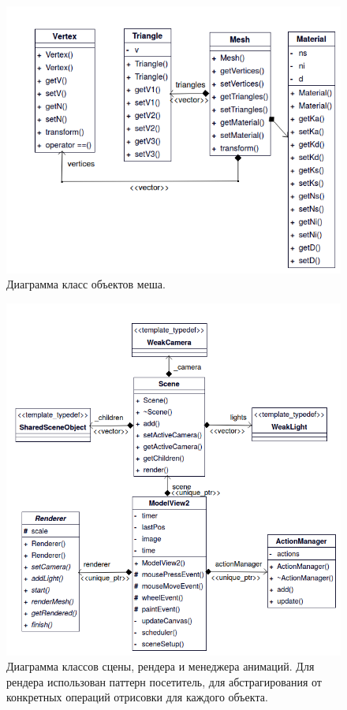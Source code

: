 \begin{figure}[H]
	\centering
	\begin{minipage}{1\textwidth}
		\centering
		\includegraphics[scale=0.65]{classes/mesh.png}
		\caption{Диаграмма класс объектов меша.}
		\label{class:mesh}
	\end{minipage}%
\end{figure}

\begin{figure}[H]
	\centering
	\begin{minipage}{1\textwidth}
		\centering
		\includegraphics[scale=0.65]{classes/scene.png}
		\caption{Диаграмма классов сцены, рендера и менеджера анимаций. Для рендера использован паттерн посетитель, для абстрагирования от конкретных операций отрисовки для каждого объекта. }
		\label{class:scene}
	\end{minipage}%
\end{figure}

